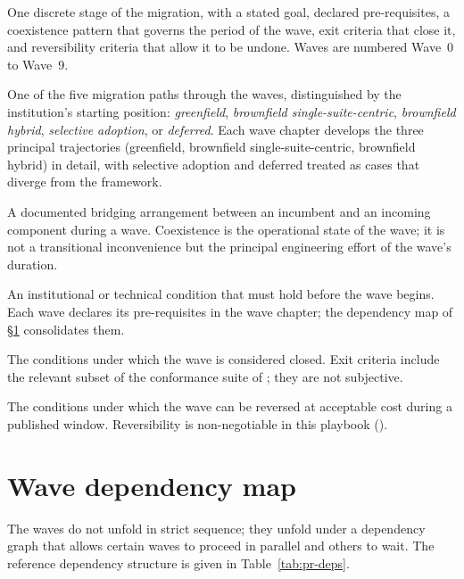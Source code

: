\begin{description}[leftmargin=1.5em,style=nextline,nosep]
  \item[Wave.] One discrete stage of the migration, with a stated
    goal, declared pre-requisites, a coexistence pattern that
    governs the period of the wave, exit criteria that close it,
    and reversibility criteria that allow it to be undone. Waves
    are numbered Wave~0 to Wave~9.
  \item[Trajectory.] One of the five migration paths through the
    waves, distinguished by the institution's starting position:
    \emph{greenfield}, \emph{brownfield single-suite-centric},
    \emph{brownfield hybrid}, \emph{selective adoption}, or
    \emph{deferred}. Each wave chapter develops the three
    principal trajectories (greenfield, brownfield
    single-suite-centric, brownfield hybrid) in detail, with selective
    adoption and deferred treated as cases that diverge from the
    framework.
  \item[Coexistence pattern.] A documented bridging arrangement
    between an incumbent and an incoming component during a wave.
    Coexistence is the operational state of the wave; it is not a
    transitional inconvenience but the principal engineering effort
    of the wave's duration.
  \item[Pre-requisite.] An institutional or technical condition
    that must hold before the wave begins. Each wave declares its
    pre-requisites in the wave chapter; the dependency map of
    \S\ref{sec:pr-dependencies} consolidates them.
  \item[Exit criteria.] The conditions under which the wave is
    considered closed. Exit criteria include the relevant subset of
    the conformance suite of ; they are
    not subjective.
  \item[Reversibility criteria.] The conditions under which the
    wave can be reversed at acceptable cost during a published
    window. Reversibility is non-negotiable in this playbook
    ().
\end{description}

\section{Wave dependency map}
\label{sec:pr-dependencies}

The waves do not unfold in strict sequence; they unfold under a
dependency graph that allows certain waves to proceed in parallel
and others to wait. The reference dependency structure is given in
Table~\ref{tab:pr-deps}.

